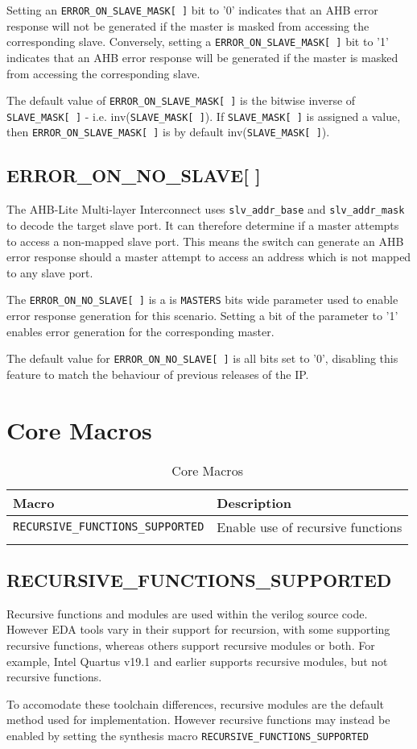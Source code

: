 Setting an \texttt{ERROR\_ON\_SLAVE\_MASK[\,]} bit to '0' indicates that an AHB error response will not be generated
if the master is masked from accessing the corresponding slave.
Conversely, setting a \texttt{ERROR\_ON\_SLAVE\_MASK[\,]} bit to '1' indicates that an AHB error response will
be generated if the master is masked from accessing the corresponding slave.

The default value of \texttt{ERROR\_ON\_SLAVE\_MASK[\,]} is the bitwise inverse of \texttt{SLAVE\_MASK[\,]} - i.e. inv(\texttt{SLAVE\_MASK[\,]}). If \texttt{SLAVE\_MASK[\,]} is assigned a value, then \texttt{ERROR\_ON\_SLAVE\_MASK[\,]} is by default inv(\texttt{SLAVE\_MASK[\,]}).

\subsection{ERROR\_ON\_NO\_SLAVE[ ]}\label{error_on_no_slave}

The AHB-Lite Multi-layer Interconnect uses \texttt{slv\_addr\_base} and \texttt{slv\_addr\_mask} to decode the target slave port. It can therefore determine if a master attempts to access a non-mapped slave port. This means the switch can generate an AHB error response should a master attempt to access an address which is not mapped to any slave port.

The \texttt{ERROR\_ON\_NO\_SLAVE[\,]} is a is \texttt{MASTERS} bits wide parameter used to enable error response generation for this scenario. Setting a bit of the parameter to '1' enables error generation for the corresponding master. 

The default value for \texttt{ERROR\_ON\_NO\_SLAVE[\,]} is all bits set to '0', disabling this feature to match the behaviour of previous releases of the IP.

\section{Core Macros}\label{core-macros}

\begin{longtable}[]{@{}ll@{}}
\toprule
Macro & Description\tabularnewline
\midrule
\endhead
\texttt{RECURSIVE\_FUNCTIONS\_SUPPORTED} & Enable use of recursive functions \tabularnewline
\bottomrule
\caption{Core Macros}
\end{longtable}

\subsection{RECURSIVE\_FUNCTIONS\_SUPPORTED}\label{recursive_functions_supported}

Recursive functions and modules are used within the verilog source code. However EDA tools vary in their support for recursion, with some supporting recursive functions, whereas others support recursive modules or both. For example, Intel Quartus v19.1 and earlier supports recursive modules, but not recursive functions. 

To accomodate these toolchain differences, recursive modules are the default method used for implementation. However recursive functions may instead be enabled by setting the synthesis macro \texttt{RECURSIVE\_FUNCTIONS\_SUPPORTED}

